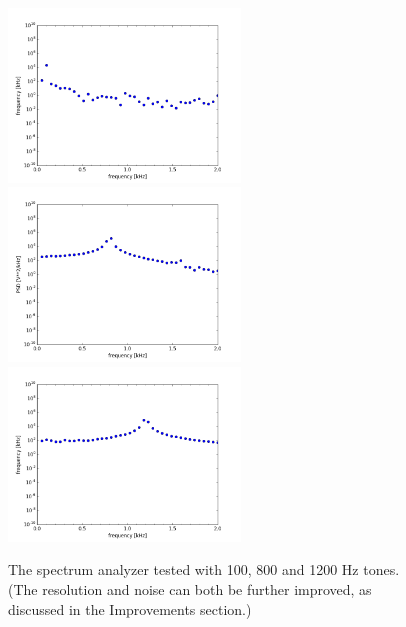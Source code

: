 \documentclass[12pt]{article}
\begin{document}
\begin{figure}[htbp]
\begin{center}
{\includegraphics[width=0.55\textwidth]{figs/poor100hz.png}} \\
{\includegraphics[width=0.55\textwidth]{figs/poor800hz.png}}\\
{\includegraphics[width=0.55\textwidth]{figs/poor1200hz.png}}
\end{center}
\caption{\label{fig:firstpass} The spectrum analyzer tested with 100, 800 and 1200 Hz tones.  (The resolution and noise can both be further improved, as discussed in the Improvements section.)}
\end{figure}
\end{document}
